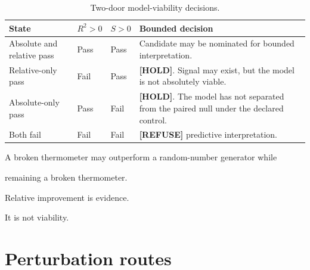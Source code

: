 \documentclass[11pt,a4paper,oneside]{report}
\providecommand{\hold}{\textcolor{geoRust}{\textbf{[HOLD]}}}
\providecommand{\refuse}{\textcolor{geoRust}{\textbf{[REFUSE]}}}
\begin{document}
\begin{table}[H]



\centering



\caption{Two-door model-viability decisions.}



\label{tab:two-door}



\begin{tabularx}{\textwidth}{L{0.23\textwidth}
    C{0.13\textwidth}
    C{0.13\textwidth}
    Y
}
\toprule
\textbf{State}
&
\textbf{$R^2>0$}
&
\textbf{$S>0$}
&
\textbf{Bounded decision}
\\
\midrule
Absolute and relative pass
&
Pass
&
Pass
&
Candidate may be nominated for bounded interpretation.
\\
\addlinespace
Relative-only pass
&
Fail
&
Pass
&
\hold{}.
Signal may exist,
but the model is not absolutely viable.
\\
\addlinespace
Absolute-only pass
&
Pass
&
Fail
&
\hold{}.
The model has not separated from the paired null under the declared
control.
\\
\addlinespace
Both fail
&
Fail
&
Fail
&
\refuse{} predictive interpretation.
\\
\bottomrule
\end{tabularx}



\end{table}





\begin{engineeringconsequence}



A broken thermometer may outperform a random-number generator while

remaining a broken thermometer.



Relative improvement is evidence.



It is not viability.



\end{engineeringconsequence}





\section{Perturbation routes}
\end{document}
